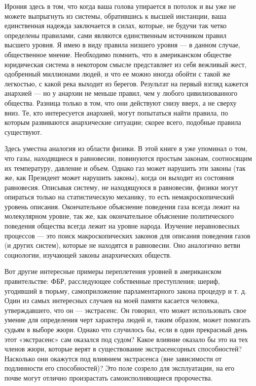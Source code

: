 \documentclass[../main.tex]{subfiles}
\begin{document}
Ирония здесь в том, что когда ваша голова упирается в потолок и вы уже не можете выпрыгнуть из системы, обратившись к высшей инстанции, ваша единственная надежда заключается в силах, которые, не будучи так четко определены правилами, сами являются единственным источником правил высшего уровня. Я имею в виду правила низшего уровня --- в данном случае, общественное мнение. Необходимо помнить, что в американском обществе юридическая система в некотором смысле представляет из себя вежливый жест, одобренный миллионами людей, и что ее можно иногда обойти с такой же легкостью, с какой река выходит из берегов. Результат на первый взгляд кажется анархией --- но у анархии не меньше правил, чем у любого цивилизованного общества. Разница только в том, что они действуют снизу вверх, а не сверху вниз. Те, кто интересуется анархией, могут попытаться найти правила, по которым развиваются анархические ситуации; скорее всего, подобные правила существуют.

Здесь уместна аналогия из области физики. В этой книге я уже упоминал о том, что газы, находящиеся в равновесии, повинуются простым законам, соотносящим их температуру, давление и объем. Однако газ может нарушить эти законы (так же, как Президент может нарушить законы), когда он выходит из состояния равновесия. Описывая систему, не находящуюся в равновесии, физики могут опираться только на статистическую механику, то есть немакроскопический уровень описания. Окончательное объяснение поведения газа всегда лежит на молекулярном уровне, так же, как окончательное объяснение политического поведения общества всегда лежит на уровне народа. Изучение неравновесных процессов --- это поиск макроскопических законов для описания поведения газов (и других систем), которые не находятся в равновесии. Оно аналогично ветви социологии, изучающей законы анархических обществ.

Вот другие интересные примеры переплетения уровней в американском правительстве: ФБР, расследующее собственные преступления; шериф, угодивший в тюрьму, самоприложение парламентарного закона процедур и т. д. Один из самых интересных случаев на моей памяти касается человека, утверждавшего, что он --- экстрасенс. Он говорил, что может использовать свое умение для определения черт характера людей и, таким образом, может помогать судьям в выборе жюри. Однако что случилось бы, если в один прекрасный день этот «экстрасенс» сам оказался под судом? Какое влияние оказало бы это на тех членов жюри, которые верят в существование экстрасенсорных способностей? Насколько они окажутся под влиянием экстрасенса (вне зависимости от подлинности его способностей)? Это поле созрело для эксплуатации, на его почве могут отлично произрастать самоисполняющиеся пророчества.
\end{document}
